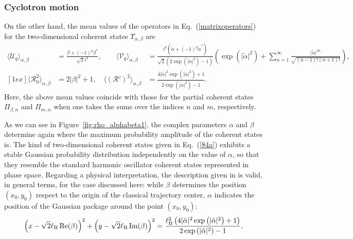 \documentclass[aps,showpacs,showkeys]{revtex4}
\begin{document}
\subsubsection{Cyclotron motion}

On the other hand, the mean values of the operators in Eq.~(\ref{matrixoperators}) for the two-dimensional coherent states $\Upsilon_{\alpha,\beta}$ are
\begin{eqnarray}
	\langle\mathcal{U}_{q}\rangle_{\alpha,\beta}&=\frac{\beta+(-1)^{q}\beta^{\ast}}{\sqrt{2}i^{q}}, \qquad \langle\mathcal{V}_{q}\rangle_{\alpha,\beta}&=\frac{i^{q}(\tilde{\alpha}+(-1)^{q}\tilde{\alpha}^{\ast})}{\sqrt{2}(2\exp\left(\vert\tilde{\alpha}\vert^2\right)-1)}\left(\exp\left(\vert\tilde{\alpha}\vert^{2}\right)+\sum_{n=1}^{\infty}\frac{\vert\tilde{\alpha}\vert^{2n}}{\sqrt{(n-1)!(n+1)!}}\right), \\ [1ex]
	\langle\mathcal{R}_{0}^{2}\rangle_{\alpha,\beta}&=2\vert\beta\vert^{2}+1, \quad \langle(\mathcal{R}')^{2} \rangle_{\alpha,\beta}&=\frac{4\vert\tilde{\alpha}\vert^{2}\exp\left(\vert\tilde{\alpha}\vert^{2}\right)+1}{2\exp\left(\vert\tilde{\alpha}\vert^2\right)-1}.
\end{eqnarray}
Here, the above mean values coincide with those for the partial coherent states $\Pi_{\beta,n}$ and $\Pi_{m,\alpha}$ when one takes the sums over the indices $n$ and $m$, respectively.

As we can see in Figure~\ref{fig:rho_alphabeta1}, the complex parameters $\alpha$ and $\beta$ determine again where the maximum probability amplitude of the coherent states is. The kind of two-dimensional coherent states given in Eq.~(\ref{84a}) exhibits a stable Gaussian probability distribution independently on the value of $\alpha$, so that they resemble the standard  harmonic oscillator coherent states represented in phase space. Regarding a physical interpretation, the description given in \cite{fk70} is valid, in general terms, for the case discussed here: while $\beta$ determines the position $(x_{0},y_{0})$ respect to the origin of the classical trajectory center, $\alpha$ indicates the position of the Gaussian package around the point $(x_0,y_0)$:
\begin{equation}\label{trajectory}
	\left(x-\sqrt{2}\ell_{\rm B}\, \textrm{Re}(\beta)\right)^{2}+\left(y-\sqrt{2}\ell_{\rm B}\, \textrm{Im}(\beta)\right)^{2}=\frac{\ell_{\rm B}^{2}\left(4\vert\tilde{\alpha}\vert^{2}\exp\left(\vert\tilde{\alpha}\vert^{2}\right)+1\right)}{2\exp\left(\vert\tilde{\alpha}\vert^2\right)-1}.
\end{equation}
\end{document}
